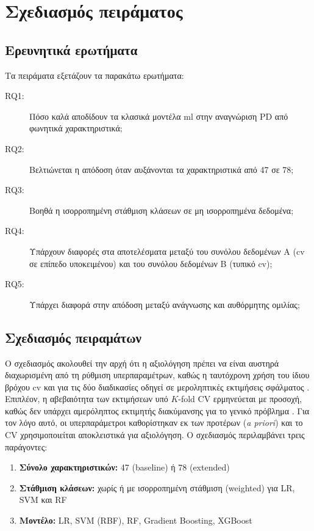 
\chapter{Σχεδιασμός πειράματος}
\label{ch:experimental-design}

\section{Ερευνητικά ερωτήματα}

Τα πειράματα εξετάζουν τα παρακάτω ερωτήματα:

\begin{description}
    \item[RQ1:] Πόσο καλά αποδίδουν τα κλασικά μοντέλα \gls{ml} στην αναγνώριση PD από φωνητικά χαρακτηριστικά;
    \item[RQ2:] Βελτιώνεται η απόδοση όταν αυξάνονται τα χαρακτηριστικά από 47 σε 78;
    \item[RQ3:] Βοηθά η ισορροπημένη στάθμιση κλάσεων σε μη ισορροπημένα δεδομένα;
    \item[RQ4:] Υπάρχουν διαφορές στα αποτελέσματα μεταξύ του συνόλου δεδομένων Α (\gls{cv} σε επίπεδο υποκειμένου) και του συνόλου δεδομένων Β (τυπικό \gls{cv});
    \item[RQ5:] Υπάρχει διαφορά στην απόδοση μεταξύ ανάγνωσης και αυθόρμητης ομιλίας;
\end{description}

\section{\texorpdfstring{Σχεδιασμός πειραμάτων}{Σχεδιασμός πειραμάτων}}

Ο σχεδιασμός ακολουθεί την αρχή ότι η αξιολόγηση πρέπει να είναι αυστηρά διαχωρισμένη από τη ρύθμιση υπερπαραμέτρων, καθώς η ταυτόχρονη χρήση του ίδιου βρόχου \gls{cv} και για τις δύο διαδικασίες οδηγεί σε μεροληπτικές εκτιμήσεις σφάλματος \citep{varma2006nestedcv, cawley2010overfitting}. Επιπλέον, η αβεβαιότητα των εκτιμήσεων υπό $K$-fold CV ερμηνεύεται με προσοχή, καθώς δεν υπάρχει αμερόληπτος εκτιμητής διακύμανσης για το γενικό πρόβλημα \citep{bengio2004no_unbiased_cv_variance}. Για τον λόγο αυτό, οι υπερπαράμετροι καθορίστηκαν εκ των προτέρων (\emph{a priori}) και το CV χρησιμοποιείται αποκλειστικά για αξιολόγηση. Ο σχεδιασμός περιλαμβάνει τρεις παράγοντες:

\begin{enumerate}
    \item \textbf{Σύνολο χαρακτηριστικών:} 47 (baseline) ή 78 (extended)
    \item \textbf{Στάθμιση κλάσεων:} χωρίς ή με ισορροπημένη στάθμιση (weighted) για LR, SVM και RF
    \item \textbf{Μοντέλο:} LR, SVM (RBF), RF, Gradient Boosting, XGBoost
\end{enumerate}

